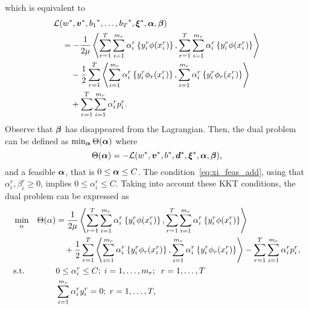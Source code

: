 which is equivalent to 
\begin{equation}
    \nonumber
    \begin{aligned}
        &  \mathcal{L}({{w}}^*, {\bm{v}}^*, {b_1}^*, \ldots, {b_T}^*, {\bm{\xi}}^*, \bm{\alpha}, \bm{\beta}) \\
        &\quad = - \frac{1}{2\mu} \bm{\left\langle}  \sum_{r= 1}^T \sum_{i=1}^{m_r} {\alpha_i^r} \left\lbrace y_i^r \phi({x}_i^r) \right\rbrace,  \sum_{r= 1}^T \sum_{i=1}^{m_r} {\alpha_i^r} \left\lbrace y_i^r \phi({x}_i^r) \right\rbrace \bm{\right\rangle} \\
        &\qquad - \frac{1}{2} \sum_{r= 1}^T {\bm{\left\langle} \sum_{i=1}^{m_r} {\alpha_i^r} \left\lbrace y_i^r \phi_r({x}_i^r) \right\rbrace, \sum_{i=1}^{m_r} {\alpha_i^r} \left\lbrace y_i^r \phi_r({x}_i^r) \right\rbrace \bm{\right\rangle}} \\
        &\qquad +  \sum_{r= 1}^T \sum_{i=1}^{m_r} \alpha_i^r  p_{i}^r .
    \end{aligned}
\end{equation}
Observe that $\bm{\beta}$ has disappeared from the Lagrangian.
Then, the dual problem can be defined as $\min_{\bm{\alpha}} \Theta(\bm{\alpha})$ where 
$$ \Theta(\bm{\alpha}) = - \mathcal{L}({{w}}^*, {\bm{v}}^*, {b}^*, {\bm{d}}^*, {\bm{\xi}}^*, \bm{\alpha}, \bm{\beta}), $$
and a feasible $\bm{\alpha}$, that is $0 \leq \bm{\alpha} \leq C$. 
The condition~\eqref{eq:xi_feas_add}, using that $\alpha_i^r , \beta_i^r \geq 0$, implies $0 \leq \alpha_i^r \leq C$. Taking into account these KKT conditions, the dual problem can be expressed as
\begin{equation}\label{eq:svmmtl_dual_add}
    \begin{aligned}
    & \min_{\alpha} & \Theta(\alpha) &=  \frac{1}{2\mu} \dotp{ \sum_{r= 1}^T \sum_{i=1}^{m_r} {\alpha_i^r} \left\lbrace y_i^r \phi({x}_i^r) \right\rbrace}{ \sum_{r= 1}^T \sum_{i=1}^{m_r} {\alpha_i^r} \left\lbrace y_i^r \phi({x}_i^r) \right\rbrace} \\
    & & &\quad + \frac{1}{2} \sum_{r= 1}^T {\dotp{\sum_{i=1}^{m_r} {\alpha_i^r} \left\lbrace y_i^r \phi_r({x}_i^r) \right\rbrace}{\sum_{i=1}^{m_r} {\alpha_i^r} \left\lbrace y_i^r \phi_r({x}_i^r) \right\rbrace}}  - \sum_{r=1}^\ntasks \sum_{i=1}^{\npertask_r} \alpha_i^r p_i^r ,\\
    & \text{s.t.}
    & & 0 \leq \alpha_i^r \leq C ; \; i=1, \ldots, \npertask_r;\;\; r=1, \ldots, \ntasks \\
    & & & \sum_{i=1}^{m_r} \alpha_i^r y_i^r = 0;\;  r=1, \ldots, \ntasks , \\
    \end{aligned}
\end{equation}
